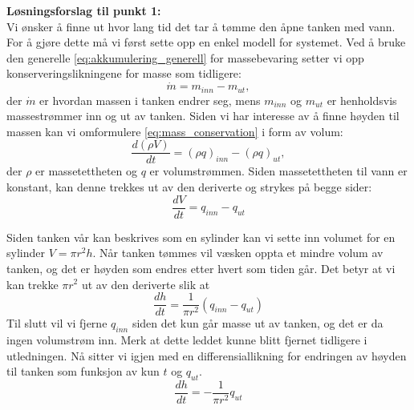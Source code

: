 \textbf{Løsningsforslag til punkt 1:} \\
Vi ønsker å finne ut hvor lang tid det tar å tømme den åpne tanken med vann. For å gjøre dette må vi først sette opp en enkel modell for systemet. Ved å bruke den generelle \cref{eq:akkumulering_generell} for massebevaring setter vi opp konserveringslikningene for masse som tidligere:
\begin{equation}
    \dot{m} = m_{inn} - m_{ut},
    \label{eq:mass_conservation}
\end{equation}
der $\dot{m}$ er hvordan massen i tanken endrer seg, mens $m_{inn}$ og $m_{ut}$ er henholdsvis massestrømmer inn og ut av tanken. Siden vi har interesse av å finne høyden til massen kan vi omformulere \eqref{eq:mass_conservation} i form av volum:
\begin{equation}
    \frac{d (\rho V)}{dt} = (\rho q)_{inn} - (\rho q)_{ut},
\end{equation}
der $\rho$ er massetettheten og $q$ er volumstrømmen. Siden massetettheten til vann er konstant, kan denne trekkes ut av den deriverte og strykes på begge sider:
\begin{equation}
    \frac{dV}{dt} = q_{inn} - q_{ut}
\end{equation}

Siden tanken vår kan beskrives som en sylinder kan vi sette inn volumet for en sylinder $V=\pi r^2h$. Når tanken tømmes vil væsken oppta et mindre volum av tanken, og det er høyden som endres etter hvert som tiden går. Det betyr at vi kan trekke $\pi r^2$ ut av den deriverte slik at
\begin{equation}
    \frac{dh}{dt} = \frac{1}{\pi r^2}(q_{inn} - q_{ut})
\end{equation}
Til slutt vil vi fjerne $q_{inn}$ siden det kun går masse ut av tanken, og det er da ingen volumstrøm inn. Merk at dette leddet kunne blitt fjernet tidligere i utledningen. Nå sitter vi igjen med en differensiallikning for endringen av høyden til tanken som funksjon av kun $t$ og $q_{ut}$. 
\begin{equation}
    \frac{dh}{dt} = -\frac{1}{\pi r^2} q_{ut}
    \label{eq:dh_dt_non_closed}
\end{equation}

